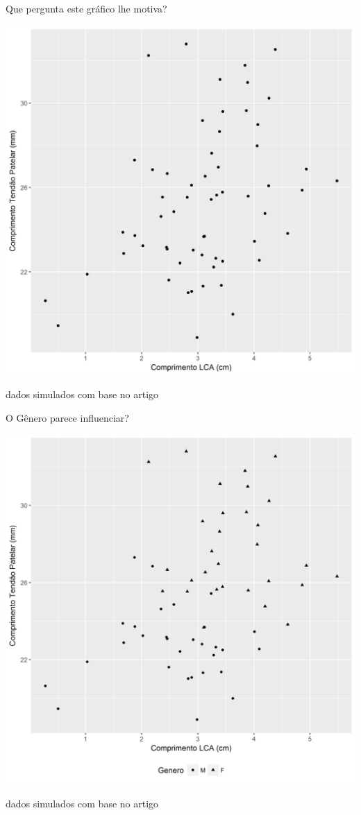 \documentclass{beamer}
\begin{document}
\begin{frame}{\scriptsize Que pergunta este gráfico lhe motiva?}
  \begin{center}
    \includegraphics[height=.8\textheight]{EDA/EDA-corr1}
  \end{center}

  \vfill
  \tiny
  \hfill dados simulados com base no artigo
\end{frame}

\begin{frame}{\scriptsize O Gênero parece influenciar?}
  \begin{center}
    \includegraphics[height=.8\textheight]{EDA/EDA-corr2}
  \end{center}

  \vfill
  \tiny
  \hfill dados simulados com base no artigo
\end{frame}
\end{document}
